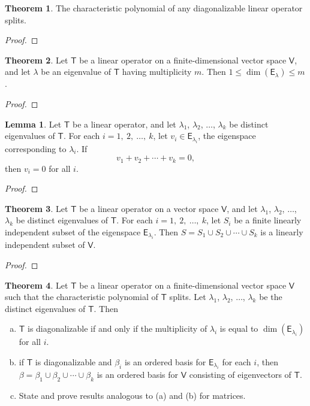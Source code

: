 \documentclass[12pt]{book}
\theoremstyle{definition}
\newtheorem{theorem}{Theorem}[chapter]
\newtheorem*{lemma*}{Lemma}
\begin{document}
	\vspace*{\fill}
	\newpage
	\begin{theorem}
		The characteristic polynomial of any diagonalizable linear operator splits.
	\end{theorem}
	\begin{proof}
	\end{proof}
	\newpage
	\begin{theorem}
		Let $\mathsf{T}$ be a linear operator on a finite-dimensional vector space $\mathsf{V}$, and let $\lambda$ be an eigenvalue of $\mathsf{T}$ having multiplicity $m$. Then $1\leq \dim(\mathsf{E}_\lambda)\leq m$.
	\end{theorem}
	\begin{proof}
	\end{proof}
	\newpage
	\begin{lemma*}
		Let $\mathsf{T}$ be a linear operator, and let $\lambda_{1}$, $\lambda_2$, $\ldots$, $\lambda_k$ be distinct eigenvalues of $\mathsf{T}$. For each $i=1,~2,~\ldots,~k$, let $v_i\in\mathsf{E}_{\lambda_i}$, the eigenspace corresponding to $\lambda_i$. If $$v_1+v_2+\cdots+v_k=\mathit{0},$$
		then $v_i=\mathit{0}$ for all $i$.
	\end{lemma*}
	\begin{proof}
	\end{proof}
	\newpage
	\begin{theorem}
		Let $\mathsf{T}$ be a linear operator on a vector space $\mathsf{V}$, and let $\lambda_1$, $\lambda_2$, $\ldots$, $\lambda_k$ be distinct eigenvalues of $\mathsf{T}$. For each $i=1,~2,~\ldots,~k$, let $S_i$ be a finite linearly independent subset of the eigenspace $\mathsf{E}_{\lambda_i}$. Then $S=S_1\cup S_2\cup \cdots\cup S_k$ is a linearly independent subset of $\mathsf{V}$.
	\end{theorem}
	\begin{proof}
	\end{proof}
	\newpage
	\begin{theorem} Let $\mathsf{T}$ be a linear operator on a finite-dimensional vector space $\mathsf{V}$ such that the characteristic polynomial of $\mathsf{T}$ splits. Let $\lambda_1$, $\lambda_2$, $\ldots$, $\lambda_k$ be the distinct eigenvalues of $\mathsf{T}$. Then
		\begin{enumerate}[(a)]
			\item $\mathsf{T}$ is diagonalizable if and only if the multiplicity of $\lambda_i$ is equal to $\dim(\mathsf{E}_{\lambda_i})$ for all $i$.
			\item if $\mathsf{T}$ is diagonalizable and $\beta_i$ is an ordered basis for $\mathsf{E}_{\lambda_i}$ for each $i$, then $\beta=\beta_1\cup \beta_2\cup\cdots\cup\beta_k$ is an ordered basis for $\mathsf{V}$ consisting of eigenvectors of $\mathsf{T}$.
			\item State and prove results analogous to (a) and (b) for matrices.
		\end{enumerate}
	\end{theorem}
\end{document}
